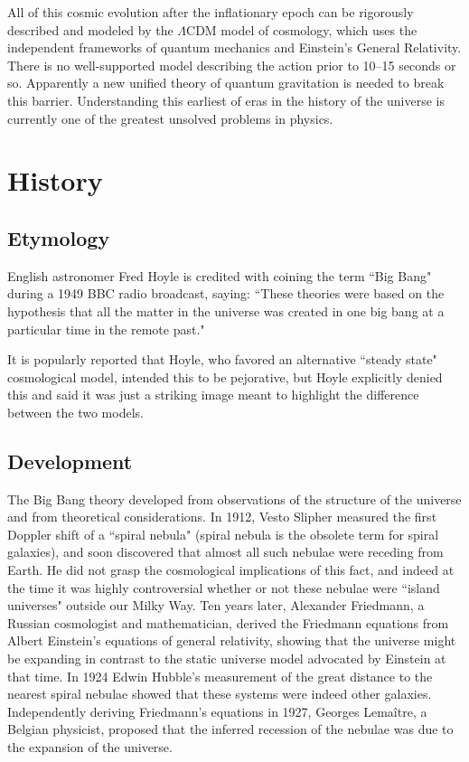 \documentclass[14pt, oneside]{book}
\begin{document}
			All of this cosmic evolution after the inflationary epoch can be rigorously described and modeled by the $\Lambda$CDM model of cosmology, which uses the independent frameworks of quantum mechanics and Einstein's General Relativity. There is no well-supported model describing the action prior to 10--15 seconds or so. Apparently a new unified theory of quantum gravitation is needed to break this barrier. Understanding this earliest of eras in the history of the universe is currently one of the greatest unsolved problems in physics.
	
	\chapter{History}
		\section{Etymology}
			English astronomer Fred Hoyle is credited with coining the term ``Big Bang" during a 1949 BBC radio broadcast, saying: ``These theories were based on the hypothesis that all the matter in the universe was created in one big bang at a particular time in the remote past."
			
			It is popularly reported that Hoyle, who favored an alternative ``steady state" cosmological model, intended this to be pejorative, but Hoyle explicitly denied this and said it was just a striking image meant to highlight the difference between the two models.
		
		\section{Development}
			The Big Bang theory developed from observations of the structure of the universe and from theoretical considerations. In 1912, Vesto Slipher measured the first Doppler shift of a ``spiral nebula" (spiral nebula is the obsolete term for spiral galaxies), and soon discovered that almost all such nebulae were receding from Earth. He did not grasp the cosmological implications of this fact, and indeed at the time it was highly controversial whether or not these nebulae were ``island universes" outside our Milky Way. Ten years later, Alexander Friedmann, a Russian cosmologist and mathematician, derived the Friedmann equations from Albert Einstein's equations of general relativity, showing that the universe might be expanding in contrast to the static universe model advocated by Einstein at that time. In 1924 Edwin Hubble's measurement of the great distance to the nearest spiral nebulae showed that these systems were indeed other galaxies. Independently deriving Friedmann's equations in 1927, Georges Lemaître, a Belgian physicist, proposed that the inferred recession of the nebulae was due to the expansion of the universe.
	
\end{document}
